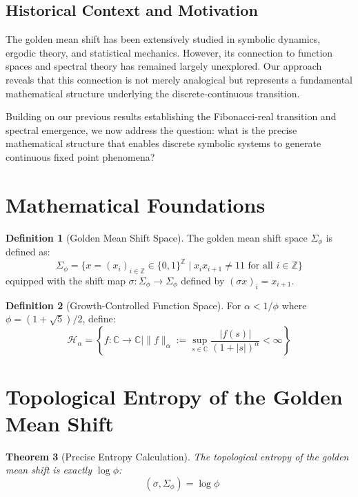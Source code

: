 \documentclass[12pt]{article}
\theoremstyle{plain}
\newtheorem{theorem}{Theorem}[section]
\theoremstyle{definition}
\newtheorem{definition}[theorem]{Definition}
\DeclareMathOperator{\htop}{h_{top}}
\begin{document}
\subsection{Historical Context and Motivation}

The golden mean shift has been extensively studied in symbolic dynamics, ergodic theory, and statistical mechanics. However, its connection to function spaces and spectral theory has remained largely unexplored. Our approach reveals that this connection is not merely analogical but represents a fundamental mathematical structure underlying the discrete-continuous transition.

Building on our previous results establishing the Fibonacci-real transition and spectral emergence, we now address the question: what is the precise mathematical structure that enables discrete symbolic systems to generate continuous fixed point phenomena?

\section{Mathematical Foundations}

\begin{definition}[Golden Mean Shift Space]
The golden mean shift space $\Sigma_\phi$ is defined as:
$$\Sigma_\phi = \{x = (x_i)_{i \in \mathbb{Z}} \in \{0,1\}^\mathbb{Z} \mid x_i x_{i+1} \neq 11 \text{ for all } i \in \mathbb{Z}\}$$
equipped with the shift map $\sigma: \Sigma_\phi \to \Sigma_\phi$ defined by $(\sigma x)_i = x_{i+1}$.
\end{definition}

\begin{definition}[Growth-Controlled Function Space]
For $\alpha < 1/\phi$ where $\phi = (1+\sqrt{5})/2$, define:
$$\mathcal{H}_\alpha = \left\{f: \mathbb{C} \to \mathbb{C} \mid \|f\|_\alpha := \sup_{s \in \mathbb{C}} \frac{|f(s)|}{(1 + |s|)^\alpha} < \infty\right\}$$
\end{definition}

\section{Topological Entropy of the Golden Mean Shift}

\begin{theorem}[Precise Entropy Calculation]
\label{thm:entropy}
The topological entropy of the golden mean shift is exactly $\log \phi$:
$$\htop(\sigma, \Sigma_\phi) = \log \phi$$
\end{theorem}
\end{document}
